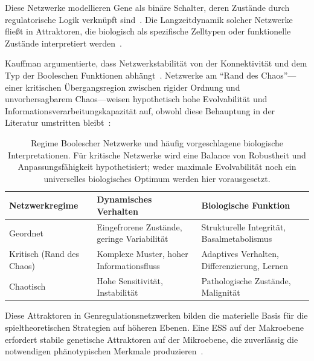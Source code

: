 \documentclass[12pt,a4paper]{article}
\theoremstyle{remark}
\begin{document}
Diese Netzwerke modellieren Gene als binäre Schalter, deren Zustände durch regulatorische Logik verknüpft sind~\citep{BooleanPost}. Die Langzeitdynamik solcher Netzwerke fließt in Attraktoren, die biologisch als spezifische Zelltypen oder funktionelle Zustände interpretiert werden~\citep{BooleanEvolution}.

Kauffman argumentierte, dass Netzwerkstabilität von der Konnektivität und dem Typ der Booleschen Funktionen abhängt~\citep{BooleanPost}. Netzwerke am ``Rand des Chaos''---einer kritischen Übergangsregion zwischen rigider Ordnung und unvorhersagbarem Chaos---weisen hypothetisch hohe Evolvabilität und Informationsverarbeitungskapazität auf, obwohl diese Behauptung in der Literatur umstritten bleibt~\citep{KauffmanOrigins}:

\begin{table}[htbp]
\centering
\caption{Regime Boolescher Netzwerke und häufig vorgeschlagene biologische Interpretationen. Für kritische Netzwerke wird eine Balance von Robustheit und Anpassungsfähigkeit hypothetisiert; weder maximale Evolvabilität noch ein universelles biologisches Optimum werden hier vorausgesetzt.}
\label{tab:network-regimes}
\begin{tabularx}{\textwidth}{@{}L{0.22\textwidth} L{0.28\textwidth} Y@{}}
\toprule
\textbf{Netzwerkregime} & \textbf{Dynamisches Verhalten} & \textbf{Biologische Funktion} \\
\midrule
Geordnet & Eingefrorene Zustände, geringe Variabilität & Strukturelle Integrität, Basalmetabolismus \\
Kritisch (Rand des Chaos) & Komplexe Muster, hoher Informationsfluss & Adaptives Verhalten, Differenzierung, Lernen \\
Chaotisch & Hohe Sensitivität, Instabilität & Pathologische Zustände, Malignität \\
\bottomrule
\end{tabularx}
\end{table}

Diese Attraktoren in Genregulationsnetzwerken bilden die materielle Basis für die spieltheoretischen Strategien auf höheren Ebenen. Eine ESS auf der Makroebene erfordert stabile genetische Attraktoren auf der Mikroebene, die zuverlässig die notwendigen phänotypischen Merkmale produzieren~\citep{BooleanMicroarray,KauffmanOrigins}.
\end{document}
